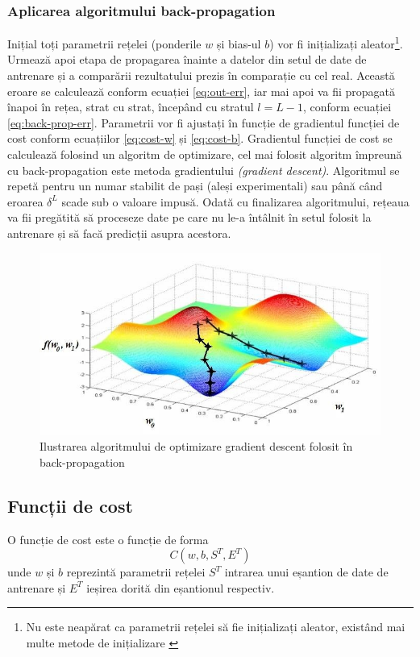 \subsubsection*{Aplicarea algoritmului back-propagation}
Inițial toți parametrii rețelei (ponderile $w$ și bias-ul $b$) vor fi inițializați aleator\footnote{Nu este neapărat ca parametrii rețelei să fie inițializați aleator, existând mai multe metode de inițializare \cite{online:weight-init-cnn}}. Urmează apoi etapa de propagarea înainte a datelor din setul de date de antrenare și a comparării rezultatului prezis în comparație cu cel real. Această eroare se calculează conform ecuației \eqref{eq:out-err}, iar mai apoi va fii propagată înapoi în rețea, strat cu strat, începând cu stratul $l = L-1$, conform ecuației \eqref{eq:back-prop-err}. Parametrii vor fi ajustați în funcție de gradientul funcției de cost conform ecuațiilor \eqref{eq:cost-w} și \eqref{eq:cost-b}. Gradientul funcției de cost se calculează folosind un algoritm de optimizare, cel mai folosit algoritm împreună cu back-propagation este metoda gradientului \textit{(gradient descent)}. Algoritmul se repetă pentru un numar stabilit de pași (aleși experimentali) sau până când eroarea $\delta^L$ scade sub o valoare impusă. Odată cu finalizarea algoritmului, rețeaua va fii pregătită să proceseze date pe care nu le-a întâlnit în setul folosit la antrenare și să facă predicții asupra acestora.
\begin{figure}[ht]
\centering
\includegraphics[width=12cm, keepaspectratio]{fig/cap2/grad-desc.jpg}
\caption{Ilustrarea algoritmului de optimizare gradient descent folosit în back-propagation \cite{vrejoiu:2019}}
\end{figure}

\subsection{Funcții de cost}\label{subch:f-cost}
O funcție de cost este o funcție de forma \cite{neuralnetbook:2015}
\begin{equation}
C(w,b,S^T,E^T)
\label{eq:cost-form}
\end{equation}
unde $w$ și $b$ reprezintă parametrii rețelei $S^T$ intrarea unui eșantion de date de antrenare și $E^T$ ieșirea dorită din eșantionul respectiv.

